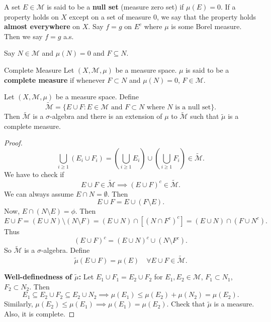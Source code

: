 \documentclass{functionspaces}
\begin{document}
\begin{definition}
A set \( E \in \mathcal{M} \) is said to be a \textbf{null set} (measure zero set) if \( \mu(E) = 0 \). If a property holds on \( X \) except on a set of measure 0, we say that the property holds \textbf{almost everywhere} on \( X \). Say \( f = g \) on \( E^c \) where \( \mu \) is some Borel measure. Then we say \( f = g \) a.s.
\end{definition}

Say \( N \in \mathcal{M} \) and \( \mu(N) = 0 \) and \( F \subseteq N \).

\begin{definition}{Complete Measure}
Let \( (X, \mathcal{M}, \mu) \) be a measure space. \( \mu \) is said to be a \textbf{complete measure} if whenever \( F \subset N \) and \( \mu(N) = 0 \), \( F \in \mathcal{M} \).
\end{definition}

\begin{theorem}
Let \( (X, \mathcal{M}, \mu) \) be a measure space. Define
\[
\tilde{\mathcal{M}} = \{ E \cup F : E \in \mathcal{M} \text{ and } F \subset N \text{ where } N \text{ is a null set} \}.
\]
Then \( \tilde{\mathcal{M}} \) is a \( \sigma \)-algebra and there is an extension of \( \mu \) to \( \tilde{\mathcal{M}} \) such that \( \tilde{\mu} \) is a complete measure.
\end{theorem}

\begin{proof}
\[
\bigcup_{i \geq 1} (E_i \cup F_i) = \left( \bigcup_{i \geq 1} E_i \right) \cup \left( \bigcup_{i \geq 1} F_i \right) \in \tilde{\mathcal{M}}.
\]
We have to check if
\[
E \cup F \in \tilde{\mathcal{M}} \implies (E \cup F)^c \in \tilde{\mathcal{M}}.
\]
We can always assume \( E \cap N = \emptyset \). Then
\[
E \cup F = E \cup (F \setminus E).
\]
Now, \( E \cap (N \setminus E) = \phi \). Then
\[
E \cup F = (E \cup N) \setminus (N \setminus F) = (E \cup N) \cap [(N \cap F^c)^c] = (E \cup N) \cap (F \cup N^c).
\]
Thus
\[
(E \cup F)^c = (E \cup N)^c \cup (N \setminus F^c).
\]
So \( \tilde{\mathcal{M}} \) is a \( \sigma \)-algebra. Define
\[
\tilde{\mu}(E \cup F) = \mu(E) \quad \forall E \cup F \in \tilde{\mathcal{M}}.
\]

\textbf{Well-definedness of \( \tilde{\mu} \):} Let \( E_1 \cup F_1 = E_2 \cup F_2 \) for \( E_1, E_2 \in \mathcal{M} \), \( F_1 \subset N_1 \), \( F_2 \subset N_2 \). Then
\[
E_1 \subseteq E_2 \cup F_2 \subseteq E_2 \cup N_2 \implies \mu(E_1) \leq \mu(E_2) + \mu(N_2) = \mu(E_2).
\]
Similarly, \( \mu(E_2) \leq \mu(E_1) \implies \mu(E_1) = \mu(E_2) \). Check that \( \tilde{\mu} \) is a measure. Also, it is complete.
\end{proof}
\end{document}
